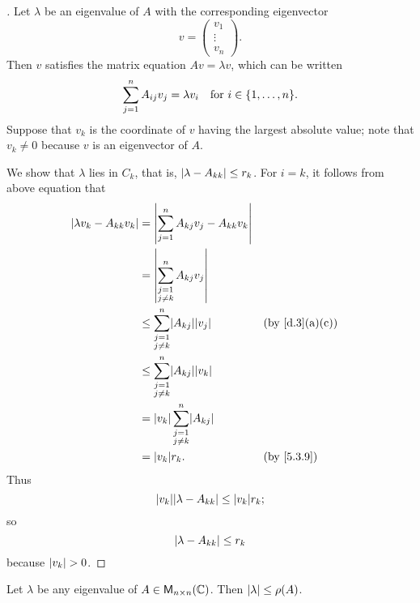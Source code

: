 \begin{proof}[]
  Let \(\lambda\) be an eigenvalue of \(A\) with the corresponding eigenvector
  \[
    v = \begin{pmatrix}
      v_1    \\
      \vdots \\
      v_n
    \end{pmatrix}.
  \]
  Then \(v\) satisfies the matrix equation \(Av = \lambda v\), which can be written
  \[
    \sum_{j = 1}^n A_{i j} v_j = \lambda v_i \quad \text{for } i \in \set{1, \dots, n}.
  \]
  Suppose that \(v_k\) is the coordinate of \(v\) having the largest absolute value;
  note that \(v_k \neq 0\) because \(v\) is an eigenvector of \(A\).

  We show that \(\lambda\) lies in \(C_k\), that is, \(\left\lvert\lambda - A_{k k}\right\rvert \leq r_k\).
  For \(i = k\), it follows from above equation that
  \begin{align*}
    \abs{\lambda v_k - A_{k k} v_k} & = \abs{\sum_{j = 1}^n A_{k j} v_j - A_{k k} v_k}                 \\
                                    & = \abs{\sum_{\substack{j = 1                                     \\ j \neq k}}^n A_{k j} v_j}              \\
                                    & \leq \sum_{\substack{j = 1                                       \\ j \neq k}}^n \abs{A_{k j}} \abs{v_j}    && \by{d.3}[a,c] \\
                                    & \leq \sum_{\substack{j = 1                                       \\ j \neq k}}^n \abs{A_{k j}} \abs{v_k}     \\
                                    & = \abs{v_k} \sum_{\substack{j = 1                                \\ j \neq k}}^n \abs{A_{k j}}        \\
                                    & = \abs{v_k} r_k.                                 &  & \by{5.3.9}
  \end{align*}
  Thus
  \[
    \abs{v_k} \abs{\lambda - A_{k k}} \leq \abs{v_k} r_k;
  \]
  so
  \[
    \left\lvert\lambda - A_{k k}\right\rvert \leq r_k
  \]
  because \(\left\lvert v_k\right\rvert > 0\).
\end{proof}

\begin{cor}\label{5.3.10}
  Let \(\lambda\) be any eigenvalue of \(A \in \ms[n][n][\C]\).
  Then \(\left\lvert\lambda\right\rvert \leq \rho(A)\).
\end{cor}

